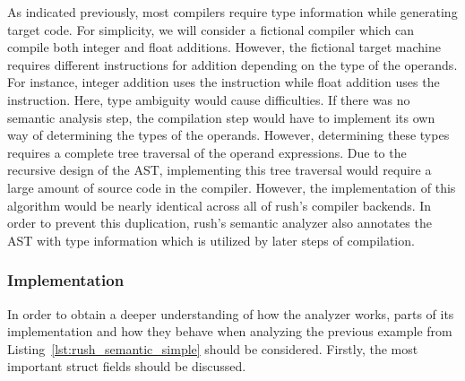 As indicated previously, most compilers require type information while
generating target code. For simplicity, we will consider a fictional compiler
which can compile both integer and float additions. However, the fictional
target machine requires different instructions for addition depending on the
type of the operands. For instance, integer addition uses the  instruction
while float addition uses the  instruction. Here, type ambiguity would
cause difficulties. If there was no semantic analysis step, the compilation step would
have to implement its own way of determining the types of the operands.
However, determining these types requires a complete
tree traversal of the operand expressions. Due to the recursive design of the
AST, implementing this tree traversal would require a large amount of source code in the compiler.
However, the implementation of this algorithm would be nearly identical across all of rush's compiler
backends.
In order to prevent this duplication, rush's semantic analyzer also annotates the AST with type
information which is utilized by later steps of compilation.

\subsubsection{Implementation}

In order to obtain a deeper understanding of how the analyzer works, parts of its implementation and how they behave when analyzing the previous example from Listing~\ref{lst:rush_semantic_simple} should be considered.
Firstly, the most important struct fields should be discussed.



